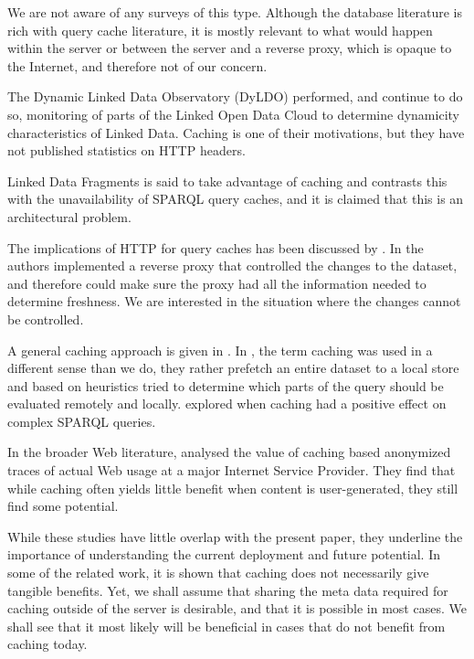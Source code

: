 \documentclass{llncs}
\begin{document}
We are not aware of any surveys of this type. Although the database
literature is rich with query cache literature, it is mostly relevant
to what would happen within the server or between the server and a
reverse proxy, which is opaque to the Internet, and therefore not of
our concern.

The \cite{dyldo2} Dynamic Linked Data Observatory (DyLDO) performed,
and continue to do so, monitoring of parts of the Linked Open Data
Cloud to determine dynamicity characteristics of Linked Data. Caching
is one of their motivations, but they have not published statistics on
HTTP headers.

Linked Data Fragments \cite{ldf1} is said to take advantage of caching
and contrasts this with the unavailability of SPARQL query caches, and
it is claimed that this is an architectural problem.

The implications of HTTP for query caches has been discussed by
\cite{kaseicache}. In \cite{sparqlproxy} the authors implemented a
reverse proxy that controlled the changes to the dataset, and
therefore could make sure the proxy had all the information needed to
determine freshness. We are interested in the situation where the
changes cannot be controlled.

A general caching approach is given in \cite{yang2011caching}.  In
\cite{umbrich2012hybrid}, the term caching was used in a different
sense than we do, they rather prefetch an entire dataset to a local
store and based on heuristics tried to determine which parts of the
query should be evaluated remotely and locally. \cite{lampo2011cache}
explored when caching had a positive effect on complex SPARQL
queries.

In the broader Web literature, \cite{ager2010revisiting} analysed the
value of caching based anonymized traces of actual Web usage at a
major Internet Service Provider. They find that while caching often
yields little benefit when content is user-generated, they still find
some potential.

While these studies have little overlap with the present paper, they
underline the importance of understanding the current deployment and
future potential. In some of the related work, it is shown that
caching does not necessarily give tangible benefits. Yet, we shall
assume that sharing the meta data required for caching outside of the
server is desirable, and that it is possible in most cases. We shall
see that it most likely will be beneficial in cases that do not
benefit from caching today.
\end{document}
